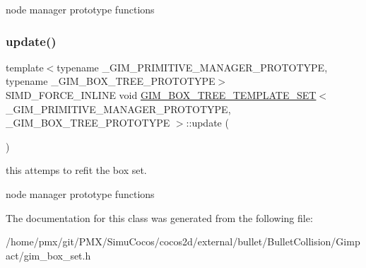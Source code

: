 node manager prototype functions \mbox{\label{classGIM__BOX__TREE__TEMPLATE__SET_a0f5f2b683e561a4e05d912cb4973dac4}} 
\subsubsection{\texorpdfstring{update()}{update()}\hspace{0.1cm}{\footnotesize\ttfamily [2/2]}}
{\footnotesize\ttfamily template$<$typename \+\_\+\+G\+I\+M\+\_\+\+P\+R\+I\+M\+I\+T\+I\+V\+E\+\_\+\+M\+A\+N\+A\+G\+E\+R\+\_\+\+P\+R\+O\+T\+O\+T\+Y\+PE, typename \+\_\+\+G\+I\+M\+\_\+\+B\+O\+X\+\_\+\+T\+R\+E\+E\+\_\+\+P\+R\+O\+T\+O\+T\+Y\+PE$>$ \\
S\+I\+M\+D\+\_\+\+F\+O\+R\+C\+E\+\_\+\+I\+N\+L\+I\+NE void \hyperlink{classGIM__BOX__TREE__TEMPLATE__SET}{G\+I\+M\+\_\+\+B\+O\+X\+\_\+\+T\+R\+E\+E\+\_\+\+T\+E\+M\+P\+L\+A\+T\+E\+\_\+\+S\+ET}$<$ \+\_\+\+G\+I\+M\+\_\+\+P\+R\+I\+M\+I\+T\+I\+V\+E\+\_\+\+M\+A\+N\+A\+G\+E\+R\+\_\+\+P\+R\+O\+T\+O\+T\+Y\+PE, \+\_\+\+G\+I\+M\+\_\+\+B\+O\+X\+\_\+\+T\+R\+E\+E\+\_\+\+P\+R\+O\+T\+O\+T\+Y\+PE $>$\+::update (\begin{DoxyParamCaption}{ }\end{DoxyParamCaption})\hspace{0.3cm}{\ttfamily [inline]}}



this attemps to refit the box set. 

node manager prototype functions 

The documentation for this class was generated from the following file\+:\begin{DoxyCompactItemize}
\item 
/home/pmx/git/\+P\+M\+X/\+Simu\+Cocos/cocos2d/external/bullet/\+Bullet\+Collision/\+Gimpact/gim\+\_\+box\+\_\+set.\+h\end{DoxyCompactItemize}
